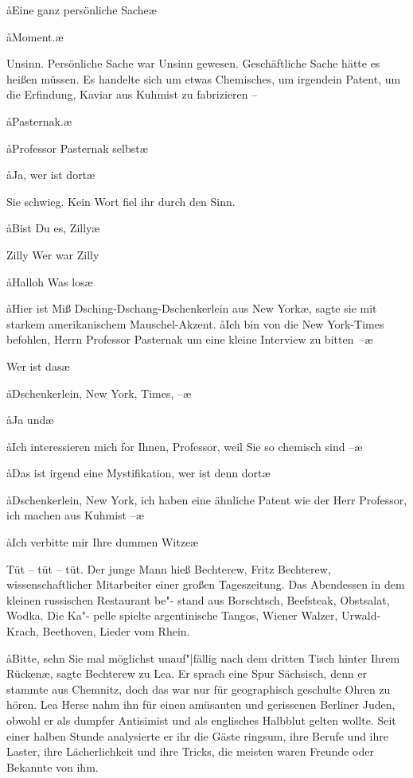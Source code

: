 \aa{}Eine ganz persönliche Sache\punkte{}\ae{}

\aa{}Moment.\ae{}

Unsinn. Persönliche Sache war Unsinn gewesen. Geschäftliche
Sache hätte es%
\eingriff{eS47-1}{es ] er}
heißen müssen. Es handelte sich um etwas
Chemisches, um irgendein Patent, um die Erfindung, Kaviar
aus Kuhmist zu fabrizieren --

\aa{}Pasternak.\ae{}

\aa{}Professor Pasternak selbst\frag{}\ae{}

\aa{}Ja, wer ist dort\frag{}\ae{}

Sie schwieg. Kein Wort fiel ihr durch den Sinn.

\aa{}Bist Du es, Zilly\frag{}\ae{}

Zilly\frag{} Wer war Zilly\frag{}

\aa{}Halloh\frag{} Was los\frag{}\ae{}

\aa{}Hier ist Miß Dsching-Dschang-Dschenkerlein aus New York\ae{},
sagte sie mit starkem amerikanischem Mauschel-Akzent. \aa{}Ich
bin von die New York-Times befohlen, Herrn Professor
Pasternak um eine kleine Interview zu bitten~--\ae{}

\aanah{}Wer ist das\frag{}\ae{}

\aa{}Dschenkerlein, New York, Times,  --\ae{}

\aa{}Ja und\frag{}\ae{}

\aa{}Ich interessieren mich for Ihnen, Professor, weil Sie so
chemisch sind --\ae{}

\aa{}Das ist irgend eine Mystifikation, wer ist denn dort\frag{}\ae{}

\aa{}Dschenkerlein, New York, ich haben eine ähnliche Patent
wie der Herr Professor, ich machen \label{lS47-1} aus
Kuhmist --\ae{}

\aa{}Ich verbitte mir Ihre dummen Witze\ausr{}\ae{}

Tüt -- tüt -- tüt.
\abstand{}
Der junge Mann hieß Bechterew, \label{lS48-1} Fritz
Bechterew, wissenschaftlicher Mitarbeiter einer großen Tageszeitung.
Das Abendessen in dem kleinen russischen Restaurant be"-%
stand aus Borschtsch, Beefsteak, Obstsalat, Wodka. Die Ka"-%
pelle spielte argentinische Tangos, Wiener Walzer, Urwald-%
Krach, Beethoven,  Lieder vom
Rhein.

\aa{}Bitte, sehn Sie mal möglichst unauf"|fällig nach dem dritten
Tisch hinter Ihrem Rücken\ae{}, sagte Bechterew zu Lea. Er
sprach eine Spur Sächsisch, denn er stammte aus Chemnitz,
doch das war nur für geographisch geschulte Ohren zu hören.
Lea Herse nahm ihn für einen amüsanten und gerissenen
Berliner Juden, obwohl er als dumpfer Antisimist und als
englisches Halbblut gelten wollte. Seit einer halben Stunde
analysierte er ihr die Gäste ringsum, ihre Berufe und ihre
Laster, ihre Lächerlichkeit und ihre Tricks, die meisten waren
Freunde oder Bekannte von ihm.


